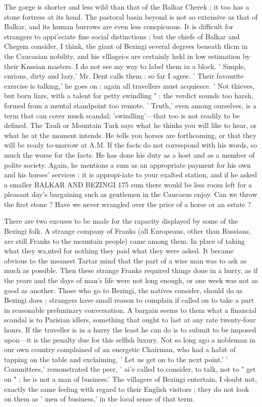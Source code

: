 \documentclass[25pt, a4paper]{article}
\begin{document}
	The gorge is shorter and less wild than that of the Balkar Cherek ; it too has a stone fortress at its head. The pastoral basin beyond is not so extensive as that of Balkar, and its human burrows are even less conspicuous. It is difficult for strangers to appi'eciate fine social distinctions ; but the chiefs of Balkar and Chegem consider, I think, the giant of Bezingi
	 several degrees beneath tlicm in the Caucasian nobility, and his vlllagei-s are certainly hekl in low estimation by their Knssian masters. I do not see my way to label them in a block. ' Simple, cnrions, dirty and lazy,' Mr. Dent calls them : so far I agree. ' Their favourite exercise is talkmg,' he goes on : again all travellers must acquiesce. ' Not thieves, but born liars, with a talent for petty swindling " : the verdict sounds too harsh, formed from a mental standpoint too remote. ' Truth,' even among ourselves, is a term that can cover much scandal; 'swindling'—that too is not readily to be defined. The Tauli or Mountain Turk says what he thinks you will like to hear, or what he at the moment intends. He tells you horses are forthcoming, or that they will be ready to-morrow at A.M. If the facts do not correspond with his words, so much the worse for the facts. He has done his duty as a host and as a member of polite society. Again, he mentions a sum as an appropriate payment for his own and his horses' services : it is appropi-iate to your exalted station, and if he asked a smaller BALKAR AND BEZINGI 175 sum there would be less room left for a pleasant day's bargaining such as gentlemen in the Caucasus enjoy. Can we throw the first stone ? Have we never wrangled over the price of a horse or an estate ?
	
	There are two excuses to be made for the rapacity displayed by some of the Bezingi folk. A strange company of Franks (all Europeans, other than Russians, are still Franks to the mountain people) came among them. In place of taking what they wa,nted for nothing they paid what they were asked. It became obvious to the meanest Tartar mind that the part of a wise man was to ask as much as possible. Then these strange Franks required things done in a hurry, as if the years and the days of man's life were not long enough, or one week was not as good as another. Those who go to Bezingi, the natives consider, should do as Bezingi does ; strangers have small reason to complain if called on to take a part in reasonable preluninary conversation. A bargain seems to them what a financial scandal is to Parisian idlers, something that ought to last at any rate twenty-four hours. If the traveller is in a hurry the least he can do is to submit to be imposed upon—it is the penalty due for this selfish luxury. Not so long ago a nobleman in our own country complained of an energetic Chairman, who had a habit of tapping on the table and exclaiming, ' Let us get on to the next point.' ' Committees,' remonstrated the peer, ' ai'e called to consider, to talk, not to " get on " ; he is not a man of business.' The villagers of Bezingi entertain, I doubt not, exactly the same feeling with regard to their English visitors ; they do not look on them as ' men of business,' in the local sense of that term.
	
\end{document}
